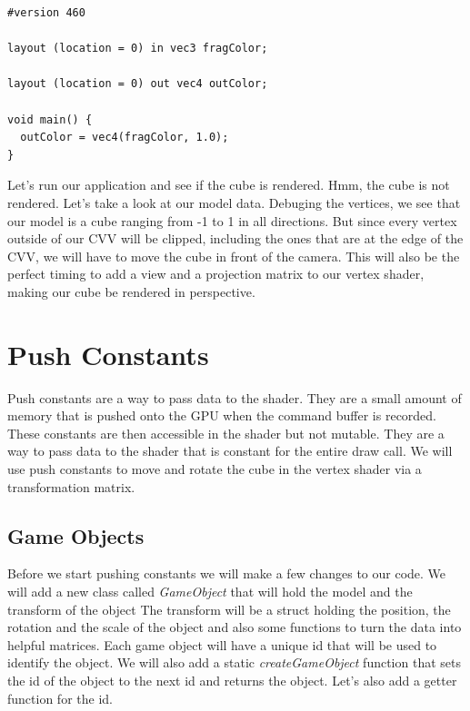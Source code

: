 \documentclass[12pt]{report} \usepackage{preamble}
\begin{document}
\begin{lstlisting}[Language=C++]
#version 460

layout (location = 0) in vec3 fragColor;

layout (location = 0) out vec4 outColor;

void main() {
  outColor = vec4(fragColor, 1.0);
}
\end{lstlisting}

Let's run our application and see if the cube is rendered. Hmm, the cube is not rendered. Let's take a look at our model data.
Debuging the vertices, we see that our model is a cube ranging from -1 to 1 in all directions. But since every vertex outside of
our \ac{CVV} will be clipped, including the ones that are at the edge of the \ac{CVV}, we will have to move the cube in front of the camera.
This will also be the perfect timing to add a view and a projection matrix to our vertex shader, making our cube be rendered in perspective.

\section{Push Constants}

Push constants are a way to pass data to the shader. They are a small amount of memory that is pushed onto the \ac{GPU} when the command buffer is recorded.
These constants are then accessible in the shader but not mutable. They are a way to pass data to the shader that is constant for the entire draw call.
We will use push constants to move and rotate the cube in the vertex shader via a transformation matrix.

\subsection{Game Objects}

Before we start pushing constants we will make a few changes to our code. We will add a new class called \textit{GameObject} that will hold the model and the transform of the object
The transform will be a struct holding the position, the rotation and the scale of the object and also some functions to turn the data into helpful matrices.
Each game object will have a unique id that will be used to identify the object. We will also add a static \textit{createGameObject} function that
sets the id of the object to the next id and returns the object. Let's also add a getter function for the id.
\end{document}
